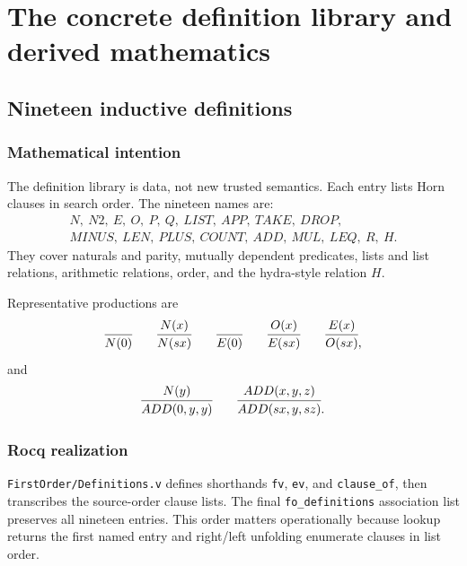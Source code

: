 \documentclass[11pt,oneside]{book}
\DeclareRobustCommand{\code}[1]{\nolinkurl{#1}}
\DeclareRobustCommand{\file}[1]{\nolinkurl{#1}}
\newcommand{\mathintent}{\subsection*{Mathematical intention}}
\newcommand{\rocqreal}{\subsection*{Rocq realization}}
\begin{document}
\chapter{The concrete definition library and derived mathematics}
\label{ch:definitions-derived}

\section{Nineteen inductive definitions}

\mathintent

The definition library is data, not new trusted semantics.  Each entry lists
Horn clauses in search order.  The nineteen names are:
\[
\begin{gathered}
 N,\ N2,\ E,\ O,\ P,\ Q,\ LIST,\ APP,\ TAKE,\ DROP,\\
 MINUS,\ LEN,\ PLUS,\ COUNT,\ ADD,\ MUL,\ LEQ,\ R,\ H.
\end{gathered}
\]
They cover naturals and parity, mutually dependent predicates, lists and list
relations, arithmetic relations, order, and the hydra-style relation \(H\).

Representative productions are
\[
 \infer{N(0)}{}
 \qquad
 \infer{N(sx)}{N(x)}
 \qquad
 \infer{E(0)}{}
 \qquad
 \infer{E(sx)}{O(x)}
 \qquad
 \infer{O(sx)}{E(x)},
\]
and
\[
 \infer{ADD(0,y,y)}{N(y)}
 \qquad
 \infer{ADD(sx,y,sz)}{ADD(x,y,z)}.
\]

\rocqreal

\file{FirstOrder/Definitions.v} defines shorthands \code{fv}, \code{ev}, and
\code{clause_of}, then transcribes the source-order clause lists.  The final
\code{fo_definitions} association list preserves all nineteen entries.  This
order matters operationally because lookup returns the first named entry and
right/left unfolding enumerate clauses in list order.
\end{document}
